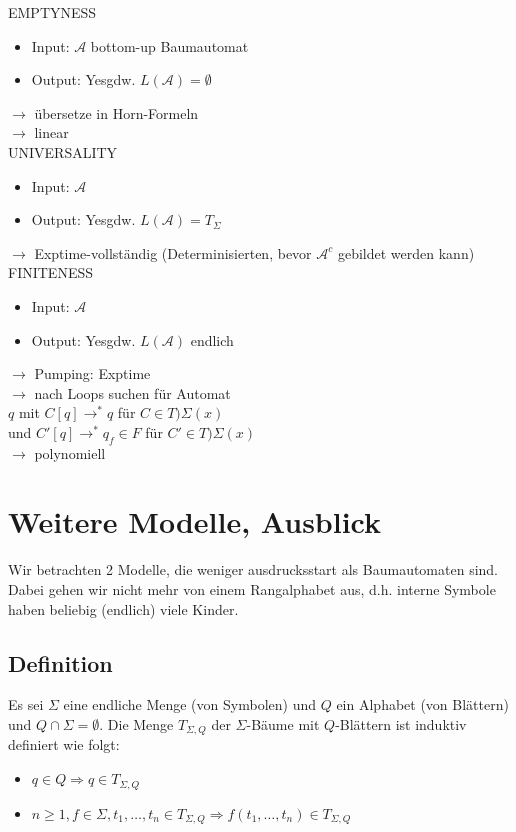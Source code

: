 \documentclass[titlepage]{article}
\begin{document}
EMPTYNESS
\begin{itemize}
    \item Input: $\mathcal{A}$ bottom-up Baumautomat
    \item Output: \glqq Yes\grqq gdw. $L(\mathcal{A}) = \emptyset$
\end{itemize}

$\rightarrow$ \"ubersetze in Horn-Formeln\\
$\rightarrow$ linear\\

UNIVERSALITY
\begin{itemize}
    \item Input: $\mathcal{A}$
    \item Output: \glqq Yes\grqq gdw. $L(\mathcal{A}) = T_\Sigma$
\end{itemize}

$\rightarrow$ Exptime-vollst\"andig (Determinisierten, bevor $\mathcal{A}^c$ gebildet werden kann)\\

FINITENESS
\begin{itemize}
    \item Input: $\mathcal{A}$
    \item Output: \glqq Yes\grqq gdw. $L(\mathcal{A})$ endlich
\end{itemize}

$\rightarrow$ Pumping: Exptime\\
$\rightarrow$ nach Loops suchen f\"ur Automat\\
$q$ mit $C[q] \to^\ast q$ f\"ur $C \in T)\Sigma(x)$\\
und $C'[q] \to^\ast q_f \in F$ f\"ur $C' \in T)\Sigma(x)$\\
$\rightarrow$ polynomiell\\

\section{Weitere Modelle, Ausblick}

Wir betrachten 2 Modelle, die weniger ausdrucksstart als Baumautomaten sind.
Dabei gehen wir nicht mehr von einem Rangalphabet aus, d.h. interne Symbole haben
beliebig (endlich) viele Kinder.

\subsection{Definition}

Es sei $\Sigma$ eine endliche Menge (von Symbolen) und $Q$ ein Alphabet (von Bl\"attern) und
$Q \cap \Sigma = \emptyset$.
Die Menge $T_{\Sigma, Q}$ der $\Sigma$-B\"aume mit $Q$-Bl\"attern ist induktiv definiert wie folgt:
\begin{itemize}
    \item $q \in Q \Rightarrow q \in T_{\Sigma, Q}$
    \item $n \geq 1, f \in \Sigma, t_1, \dots, t_n \in T_{\Sigma, Q}
        \Rightarrow f(t_1, \dots, t_n) \in T_{\Sigma, Q}$
\end{itemize}
\end{document}
